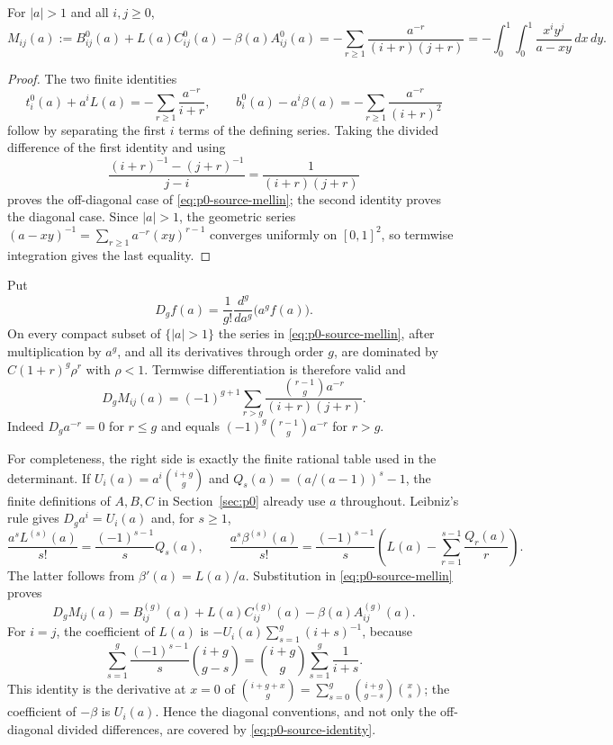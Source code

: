 \begin{lemma}
\label{lem:p0-source-mellin}
For $|a|>1$ and all $i,j\ge0$,
\begin{equation}\label{eq:p0-source-mellin}
 M_{ij}(a):=B^0_{ij}(a)+L(a)C^0_{ij}(a)-\beta(a)A^0_{ij}(a)
 =-\sum_{r\ge1}\frac{a^{-r}}{(i+r)(j+r)}
 =-\int_0^1\!\!\int_0^1\frac{x^iy^j}{a-xy}\,dx\,dy.
\end{equation}
\end{lemma}
\begin{proof}
The two finite identities
\[
 t_i^0(a)+a^iL(a)=-\sum_{r\ge1}\frac{a^{-r}}{i+r},\qquad
 b_i^0(a)-a^i\beta(a)=-\sum_{r\ge1}\frac{a^{-r}}{(i+r)^2}
\]
follow by separating the first $i$ terms of the defining series.  Taking the
divided difference of the first identity and using
\[
 \frac{(i+r)^{-1}-(j+r)^{-1}}{j-i}
 =\frac1{(i+r)(j+r)}
\]
proves the off-diagonal case of \eqref{eq:p0-source-mellin}; the second
identity proves the diagonal case.  Since $|a|>1$, the geometric series
$(a-xy)^{-1}=\sum_{r\ge1}a^{-r}(xy)^{r-1}$ converges uniformly on
$[0,1]^2$, so termwise integration gives the last equality.
\end{proof}

Put
\[
 D_g f(a)=\frac1{g!}\frac{d^g}{da^g}\bigl(a^gf(a)\bigr).
\]
On every compact subset of $\{|a|>1\}$ the series in
\eqref{eq:p0-source-mellin}, after multiplication by $a^g$, and all its
derivatives through order $g$, are dominated by $C(1+r)^g\rho^r$ with
$\rho<1$.  Termwise differentiation is therefore valid and
\begin{equation}\label{eq:p0-source-Dg}
 D_gM_{ij}(a)=(-1)^{g+1}\sum_{r>g}
 \frac{\binom{r-1}{g}a^{-r}}{(i+r)(j+r)}.
\end{equation}
Indeed $D_ga^{-r}=0$ for $r\le g$ and equals
$(-1)^g\binom{r-1}{g}a^{-r}$ for $r>g$.

For completeness, the right side is exactly the finite rational table used in
the determinant.  If $U_i(a)=a^i\binom{i+g}{g}$ and
$Q_s(a)=(a/(a-1))^s-1$, the finite definitions of $A,B,C$ in
Section~\ref{sec:p0} already use $a$ throughout.  Leibniz's rule gives
$D_ga^i=U_i(a)$ and, for $s\ge1$,
\[
 \frac{a^sL^{(s)}(a)}{s!}=\frac{(-1)^{s-1}}sQ_s(a),\qquad
 \frac{a^s\beta^{(s)}(a)}{s!}=\frac{(-1)^{s-1}}s
 \left(L(a)-\sum_{r=1}^{s-1}\frac{Q_r(a)}r\right).
\]
The latter follows from $\beta'(a)=L(a)/a$.  Substitution in
\eqref{eq:p0-source-mellin} proves
\begin{equation}\label{eq:p0-source-identity}
 D_gM_{ij}(a)=B^{(g)}_{ij}(a)+L(a)C^{(g)}_{ij}(a)
                         -\beta(a)A^{(g)}_{ij}(a).
\end{equation}
For $i=j$, the coefficient of $L(a)$ is
$-U_i(a)\sum_{s=1}^g(i+s)^{-1}$, because
\[
 \sum_{s=1}^g\frac{(-1)^{s-1}}s\binom{i+g}{g-s}
 =\binom{i+g}{g}\sum_{s=1}^g\frac1{i+s}.
\]
This identity is the derivative at $x=0$ of
$\binom{i+g+x}{g}=\sum_{s=0}^g\binom{i+g}{g-s}\binom{x}{s}$;
the coefficient of $-\beta$ is $U_i(a)$.  Hence the diagonal conventions,
and not only the off-diagonal divided differences, are covered by
\eqref{eq:p0-source-identity}.

